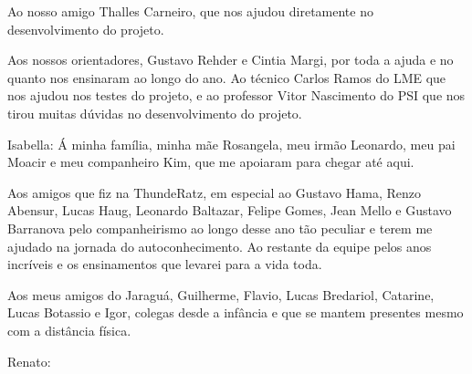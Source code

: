 \documentclass[]{politex}
\begin{document}
\capa

\falsafolhaderosto

\folhaderosto




\begin{agradecimentos}
	Ao nosso amigo Thalles Carneiro, que nos ajudou diretamente no desenvolvimento do projeto. 
	
	Aos nossos orientadores, Gustavo Rehder e Cintia Margi, por toda a ajuda e no quanto nos ensinaram ao longo do ano. Ao técnico Carlos Ramos do LME que nos ajudou nos testes do projeto, e ao professor Vitor Nascimento do PSI que nos tirou muitas dúvidas no desenvolvimento do projeto. 

	\hfill \break
	
	Isabella: Á minha família, minha mãe Rosangela, meu irmão Leonardo, meu pai Moacir e meu companheiro Kim, que me apoiaram para chegar até aqui. 
 
	Aos amigos que fiz na ThundeRatz, em especial ao Gustavo Hama, Renzo Abensur, Lucas Haug, Leonardo Baltazar, Felipe Gomes, Jean Mello e Gustavo Barranova pelo companheirismo ao longo desse ano tão peculiar e terem me ajudado na jornada do autoconhecimento. Ao restante da equipe pelos anos incríveis e os ensinamentos que levarei para a vida toda. 
	
	Aos meus amigos do Jaraguá, Guilherme, Flavio, Lucas Bredariol, Catarine, Lucas Botassio e Igor, colegas desde a infância e que se mantem presentes mesmo com a distância física.

	\hfill \break

	Renato: 
\end{agradecimentos}

\end{document}
